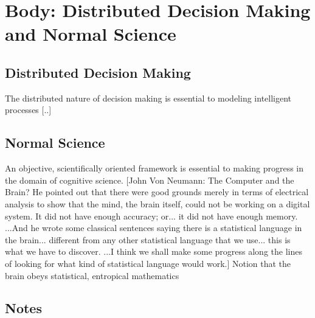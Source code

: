 \documentclass[a4paper]{article}
\begin{document}
\section{Body: Distributed Decision Making and Normal Science}

\subsection{Distributed Decision Making}

    The distributed nature of decision making is essential to modeling intelligent processes [..]

\subsection{Normal Science}

    An objective, scientifically oriented framework is essential to making progress in the domain of cognitive science.
    [John Von Neumann: The Computer and the Brain?
    He pointed out that there were good grounds merely in terms of electrical analysis to show that the mind, the brain itself, could not be working on a digital system. It did not have enough accuracy; or... it did not have enough memory. ...And he wrote some classical sentences saying there is a statistical language in the brain... different from any other statistical language that we use... this is what we have to discover. ...I think we shall make some progress along the lines of looking for what kind of statistical language would work.]
    Notion that the brain obeys statistical, entropical mathematics

\subsection{Notes}
\end{document}
